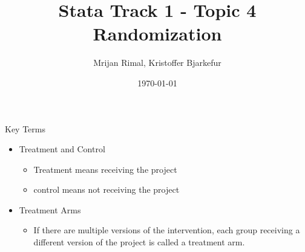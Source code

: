 \documentclass[aspectratio=169]{beamer}
\title{Stata Track 1 - Topic 4 \newline Randomization}
\date{\today}
\author{Mrijan Rimal, Kristoffer Bjarkefur} %
\institute{Development Impact Evaluation (DIME) \newline The World Bank }
\begin{document}
	{
		\maketitle
	}

\begin{frame}{Key Terms}
	\begin{itemize}
		\item Treatment and Control
		\begin{itemize}
			\item Treatment means receiving the project
			\item control means not receiving the project
		\end{itemize}
		\item Treatment Arms
		\begin{itemize}
			\item If there are multiple versions of the intervention, each group receiving a different version of the project is called a treatment arm.
		\end{itemize}
	\end{itemize}
\end{frame}
\end{document}
